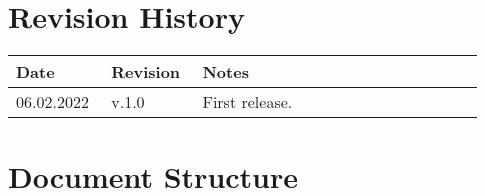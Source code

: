 \section{Revision History}

\begin{center}
	\begin{longtable}{@{}p{0.18\linewidth} p{0.18\linewidth} p{0.57\linewidth}@{}}
		\toprule
		\textbf{Date}   & \textbf{Revision} & \textbf{Notes}\\
		\midrule
        06.02.2022     	& v.1.0             & First release.\\
		\bottomrule
	\end{longtable}
\end{center}

\printbibliography[title={Reference Documents}, keyword=intro, heading=subbibnumbered]

\section{Document Structure}

